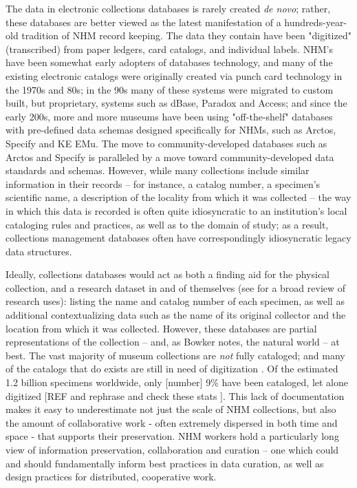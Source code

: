The data in electronic collections databases is rarely created \textit{de novo}; rather, these databases are better viewed as the latest manifestation of a hundreds-year-old tradition of NHM record keeping. The data they contain have been "digitized" (transcribed) from paper ledgers, card catalogs, and individual labels. NHM's have been somewhat early adopters of databases technology, and many of the existing electronic catalogs were originally created via punch card technology in the 1970s and 80s; in the 90s many of these systems were migrated to custom built, but proprietary, systems such as dBase, Paradox and Access; and since the early 200s, more and more museums have been using "off-the-shelf" databases with pre-defined data schemas designed specifically for NHMs, such as Arctos, Specify and KE EMu. The move to community-developed databases such as Arctos and Specify is paralleled by a move toward community-developed data standards and schemas.  However, while many collections include similar information in their records – for instance, a catalog number, a specimen’s scientific name, a description of the locality from which it was collected – the way in which this data is recorded is often quite idiosyncratic to an institution’s local cataloging rules and practices, as well as to the domain of study; as a result, collections management databases often have correspondingly idiosyncratic legacy data structures.

Ideally, collections databases would act as both a finding aid for the physical collection, and a research dataset in and of themselves (see \cite{Chapman2005} for a broad review of research uses): listing the name and catalog number of each specimen, as well as additional contextualizing data such as the name of its original collector and the location from which it was collected. However, these databases are partial representations of the collection -- and, as Bowker notes, the natural world \cite{Bowker_2000} -- at best. The vast majority of museum collections are \textit{not} fully cataloged; and many of the catalogs that do exists are still in need of digitization \cite{Beaman_2012}. Of the estimated 1.2 billion specimens worldwide, only [number] 9\% have been cataloged, let alone digitized [REF and rephrase and check these stats \cite{Ari_o_2010}]. This lack of documentation makes it easy to underestimate not just the scale of NHM collections, but also the amount of collaborative work  - often extremely dispersed in both time and space - that supports their preservation. NHM workers hold a particularly long view of information preservation, collaboration and curation -- one which could and should fundamentally inform best practices in data curation, as well as design practices for distributed, cooperative work.

